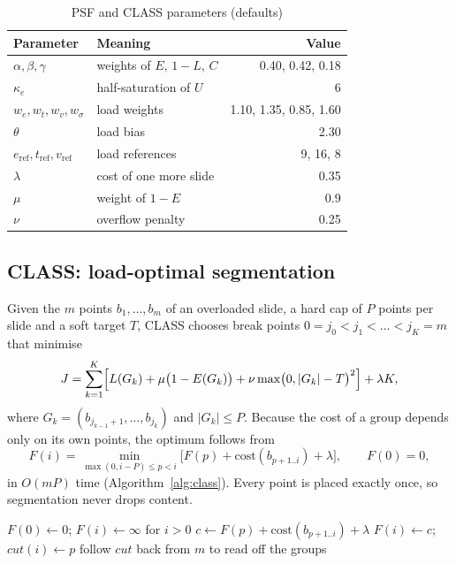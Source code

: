 \documentclass[conference]{IEEEtran}
\begin{document}
\begin{table}[H]
\centering
\caption{PSF and CLASS parameters (defaults)}
\label{tab:params}
\begin{tabular}{llr}
\toprule
Parameter & Meaning & Value \\
\midrule
$\alpha,\beta,\gamma$ & weights of $E$, $1-L$, $C$ & 0.40, 0.42, 0.18 \\
$\kappa_e$ & half-saturation of $U$ & 6 \\
$w_e,w_t,w_v,w_\sigma$ & load weights & 1.10, 1.35, 0.85, 1.60 \\
$\theta$ & load bias & 2.30 \\
$e_{\mathrm{ref}},t_{\mathrm{ref}},v_{\mathrm{ref}}$ & load references & 9, 16, 8 \\
$\lambda$ & cost of one more slide & 0.35 \\
$\mu$ & weight of $1-E$ & 0.9 \\
$\nu$ & overflow penalty & 0.25 \\
\bottomrule
\end{tabular}
\end{table}

\subsection{CLASS: load-optimal segmentation}
Given the $m$ points $b_1,\dots,b_m$ of an overloaded slide, a hard cap of $P$ points per slide and a soft target $T$, CLASS
chooses break points $0=j_0<j_1<\dots<j_K=m$ that minimise
\begin{equation}
J=\sum_{k=1}^{K}\Bigl[L(G_k)+\mu\bigl(1-E(G_k)\bigr)+\nu\max\bigl(0,|G_k|-T\bigr)^2\Bigr]+\lambda K,
\end{equation}
where $G_k=(b_{j_{k-1}+1},\dots,b_{j_k})$ and $|G_k|\le P$. Because the cost of a group depends only on its own points, the
optimum follows from
\begin{equation}
F(i)=\min_{\max(0,i-P)\le p<i}\bigl[F(p)+\mathrm{cost}(b_{p+1..i})+\lambda\bigr],\qquad F(0)=0,
\end{equation}
in $O(mP)$ time (Algorithm~\ref{alg:class}). Every point is placed exactly once, so segmentation never drops content.

\begin{algorithm}[H]
\caption{CLASS}
\label{alg:class}
\begin{algorithmic}[1]
\State $F(0)\gets 0$; $F(i)\gets\infty$ for $i>0$
    \State $c\gets F(p)+\mathrm{cost}(b_{p+1..i})+\lambda$
     \State $F(i)\gets c$; $\mathit{cut}(i)\gets p$ \EndIf
  \EndFor
\EndFor
\State follow $\mathit{cut}$ back from $m$ to read off the groups
\end{algorithmic}
\end{algorithm}
\end{document}
